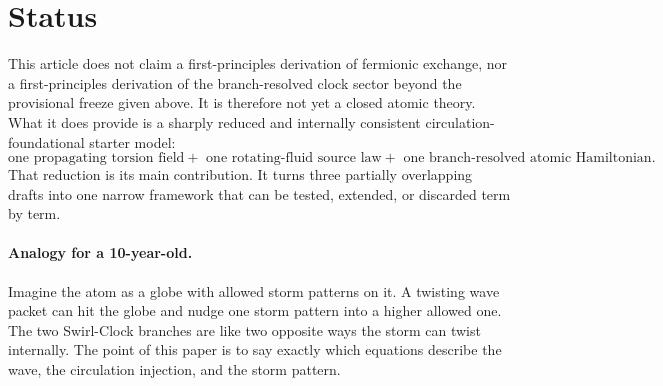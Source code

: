\documentclass[11pt,a4paper]{article}
\begin{document}
\section{Status}
This article does not claim a first-principles derivation of fermionic exchange, nor a first-principles derivation of the branch-resolved clock sector beyond the provisional freeze given above. It is therefore not yet a closed atomic theory. What it does provide is a sharply reduced and internally consistent circulation-foundational starter model:
\begin{equation}
\boxed{
\text{one propagating torsion field}
+\text{ one rotating-fluid source law}
+\text{ one branch-resolved atomic Hamiltonian}.
}
\end{equation}
That reduction is its main contribution. It turns three partially overlapping drafts into one narrow framework that can be tested, extended, or discarded term by term.

\paragraph{Analogy for a 10-year-old.} Imagine the atom as a globe with allowed storm patterns on it. A twisting wave packet can hit the globe and nudge one storm pattern into a higher allowed one. The two Swirl-Clock branches are like two opposite ways the storm can twist internally. The point of this paper is to say exactly which equations describe the wave, the circulation injection, and the storm pattern.
\end{document}
